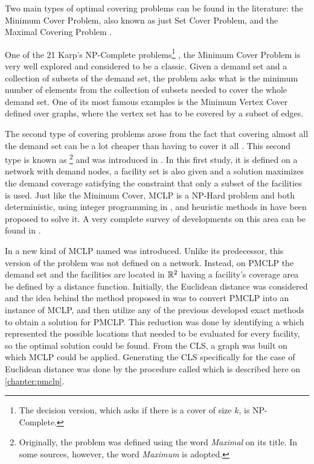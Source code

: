 Two main types of optimal covering problems can be found in the literature: the Minimum Cover Problem, also known as just Set Cover Problem, and the Maximal Covering Problem \cite{karatas}. 

One of the 21 Karp's NP-Complete problems\footnote{The decision version, which asks if there is a cover of size $k$, is NP-Complete.} \cite{karp}, the Minimum Cover Problem is very well explored and considered to be a classic. 
Given a demand set and a collection of subsets of the demand set, the problem asks what is the minimum number of elements from the collection of subsets needed to cover the whole demand set. One of its most famous examples is the Minimum Vertex Cover defined over graphs, where the vertex set has to be covered by a subset of edges.

The second type of covering problems arose from the fact that covering almost all the demand set can be a lot cheaper than having to cover it all \cite{garcia}. This second type is known as \footnote{Originally, the problem was defined using the word \textit{Maximal} on its title. In some sources, however, the word \textit{Maximum} is adopted.} and was introduced in . In this first study, it is defined on a network with demand nodes, a facility set is also given and a solution maximizes the demand coverage satisfying the constraint that only a subset of the facilities is used. Just like the Minimum Cover, MCLP is a NP-Hard problem \cite{hatta:2013} and both deterministic, using integer programming in , and heuristic methods in  have been proposed to solve it. A very complete survey of developments on this area can be found in .

In  a new kind of MCLP named  was introduced. Unlike its predecessor, this version of the problem was not defined on a network. Instead, on PMCLP the demand set and the facilities are located in $\mathbb{R}^2$ having a facility's coverage area be defined by a distance function. 
Initially, the Euclidean distance was considered and the idea behind the method proposed in  was to convert PMCLP into an instance of MCLP, and then utilize any of the previous developed exact methods to obtain a solution for PMCLP. This reduction was done by identifying a  which represented the possible locations that needed to be evaluated for every facility, so the optimal solution could be found. From the CLS, a graph was built on which MCLP could be applied. Generating the CLS specifically for the case of Euclidean distance was done by the procedure called  which is described here on \autoref{chapter:pmclp}.

